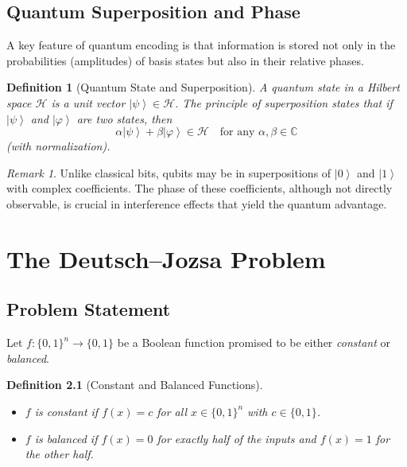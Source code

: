 \documentclass[11pt,oneside]{book}
\newtheorem{definition}{Definition}[chapter]
\theoremstyle{remark}
\newtheorem*{remark}{Remark}
\renewcommand{\ket}[1]{\left|#1\right\rangle}      %
\begin{document}
	\section{Quantum Superposition and Phase}
	
	A key feature of quantum encoding is that information is stored not only in the probabilities (amplitudes) of basis states but also in their relative phases.
	
	\begin{definition}[Quantum State and Superposition]
		A quantum state in a Hilbert space \( \mathcal{H} \) is a unit vector \( \ket{\psi} \in \mathcal{H} \). The principle of superposition states that if \( \ket{\psi} \) and \( \ket{\varphi} \) are two states, then 
		\[
		\alpha \ket{\psi} + \beta \ket{\varphi} \in \mathcal{H} \quad \text{for any } \alpha, \beta \in \mathbb{C}
		\]
		(with normalization).
	\end{definition}
	
	\begin{remark}
		Unlike classical bits, qubits may be in superpositions of \( \ket{0} \) and \( \ket{1} \) with complex coefficients. The phase of these coefficients, although not directly observable, is crucial in interference effects that yield the quantum advantage.
	\end{remark}
	
	\chapter{The Deutsch--Jozsa Problem}
	
	\section{Problem Statement}
	
	Let \( f : \{0,1\}^n \to \{0,1\} \) be a Boolean function promised to be either \emph{constant} or \emph{balanced}. 
	
	\begin{definition}[Constant and Balanced Functions]
		\begin{itemize}[leftmargin=*, labelsep=5mm]
			\item \( f \) is \emph{constant} if \( f(x)=c \) for all \( x \in \{0,1\}^n \) with \( c\in\{0,1\} \).
			\item \( f \) is \emph{balanced} if \( f(x)=0 \) for exactly half of the inputs and \( f(x)=1 \) for the other half.
		\end{itemize}
	\end{definition}
	
\end{document}
